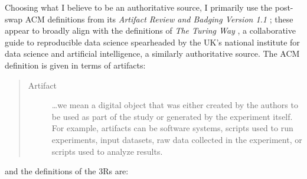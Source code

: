 \documentclass[logo,msc,dsti]{style/infthesis}    %
\begin{document}
Choosing what I believe to be an authoritative source, I primarily use the post-swap ACM definitions from its \emph{Artifact Review and Badging Version 1.1} \cite{association_for_computing_machiner_artifact_2020}; these appear to broadly align with the definitions of \emph{The Turing Way} \cite{turingway2022}, a collaborative guide to reproducible data science spearheaded by the UK's national institute for data science and artificial intelligence, a similarly authoritative source. The ACM definition is given in terms of artifacts:

\begin{quote}
\begin{description}
\item[Artifact]

\ldots we mean a digital object that was either created by the authors to be used as part of the study or generated by the experiment itself. For example, artifacts can be software systems, scripts used to run experiments, input datasets, raw data collected in the experiment, or scripts used to analyze results.
\end{description}
\end{quote}
and the definitions of the 3Rs are:
\end{document}
